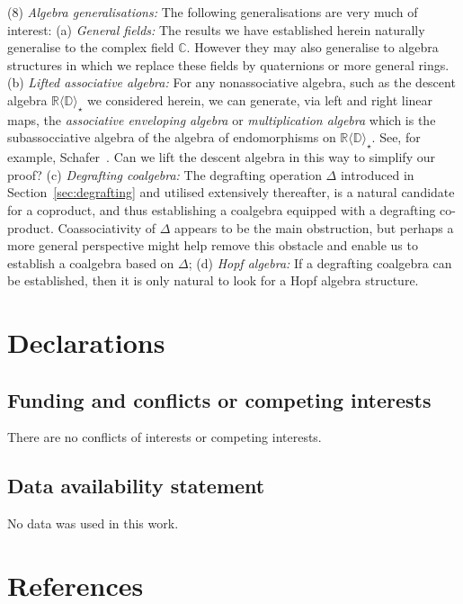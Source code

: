 \documentclass[5p,twocolumn]{elsarticle}
\newcommand*{\R}{\mathbb R}
\begin{document}
(8) \emph{Algebra generalisations:} The following generalisations are very much of interest:
(a) \emph{General fields:} The results we have established herein naturally generalise to the complex field $\mathbb C$.
However they may also generalise to algebra structures in which we replace these fields by quaternions or more general rings.
(b) \emph{Lifted associative algebra:} For any nonassociative algebra, such as the descent algebra $\R\langle\mathbb D\rangle_{\star}$ we considered herein, we can generate, via left and right linear maps,
the \emph{associative enveloping algebra} or \emph{multiplication algebra} which is the subassocciative algebra of the algebra of endomorphisms on $\R\langle\mathbb D\rangle_{\star}$.   
See, for example, Schafer~\cite{Schafer}. Can we lift the descent algebra in this way to simplify our proof? 
(c) \emph{Degrafting coalgebra:} The degrafting operation $\Delta$ introduced in Section~\ref{sec:degrafting} and utilised extensively thereafter, is a natural candidate for a coproduct,
and thus establishing a coalgebra equipped with a degrafting co-product.
Coassociativity of $\Delta$ appears to be the main obstruction, but perhaps a more general perspective might help remove this obstacle and enable us to establish a coalgebra based on $\Delta$;
(d) \emph{Hopf algebra:} If a degrafting coalgebra can be established, then it is only natural to look for a Hopf algebra structure. 





\section{Declarations}

\subsection{Funding and conflicts or competing interests}
There are no conflicts of interests or competing interests. 

\subsection{Data availability statement}
No data was used in this work. 




\section*{References}
\end{document}
